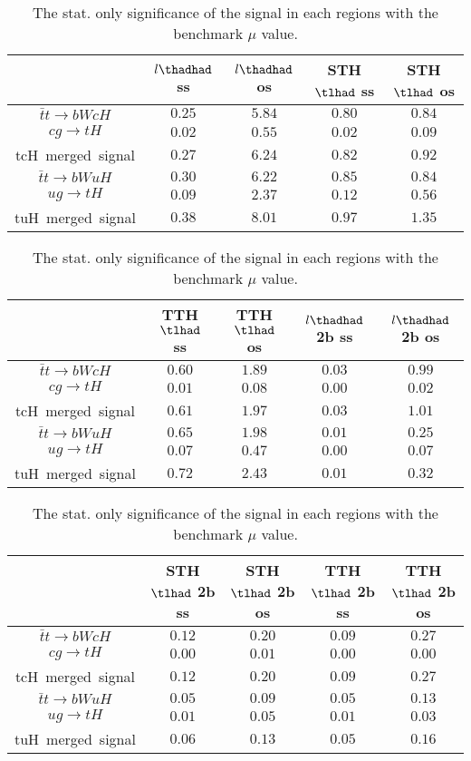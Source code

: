 \begin{table}
\footnotesize
\caption{The stat. only significance of the signal in each regions with the benchmark $\mu$ value.}
\centering
\begin{tabular}{|c|c|c|c|c|} \hline
 & $l\thadhad$ ss & $l\thadhad$ os & STH $\tlhad$ ss & STH $\tlhad$ os\\\hline
$\bar{t}t\to bWcH$ & $0.25$ & $5.84$ & $0.80$ & $0.84$\\\hline
$cg\to tH$ & $0.02$ & $0.55$ & $0.02$ & $0.09$\\\hline
tcH~merged~signal & $0.27$ & $6.24$ & $0.82$ & $0.92$\\\hline
$\bar{t}t\to bWuH$ & $0.30$ & $6.22$ & $0.85$ & $0.84$\\\hline
$ug\to tH$ & $0.09$ & $2.37$ & $0.12$ & $0.56$\\\hline
tuH~merged~signal & $0.38$ & $8.01$ & $0.97$ & $1.35$\\\hline
\end{tabular}
\begin{tabular}{|c|c|c|c|c|} \hline
 & TTH $\tlhad$ ss & TTH $\tlhad$ os & $l\thadhad$ 2b ss & $l\thadhad$ 2b os\\\hline
$\bar{t}t\to bWcH$ & $0.60$ & $1.89$ & $0.03$ & $0.99$\\\hline
$cg\to tH$ & $0.01$ & $0.08$ & $0.00$ & $0.02$\\\hline
tcH~merged~signal & $0.61$ & $1.97$ & $0.03$ & $1.01$\\\hline
$\bar{t}t\to bWuH$ & $0.65$ & $1.98$ & $0.01$ & $0.25$\\\hline
$ug\to tH$ & $0.07$ & $0.47$ & $0.00$ & $0.07$\\\hline
tuH~merged~signal & $0.72$ & $2.43$ & $0.01$ & $0.32$\\\hline
\end{tabular}
\begin{tabular}{|c|c|c|c|c|} \hline
 & STH $\tlhad$ 2b ss & STH $\tlhad$ 2b os & TTH $\tlhad$ 2b ss & TTH $\tlhad$ 2b os\\\hline
$\bar{t}t\to bWcH$ & $0.12$ & $0.20$ & $0.09$ & $0.27$\\\hline
$cg\to tH$ & $0.00$ & $0.01$ & $0.00$ & $0.00$\\\hline
tcH~merged~signal & $0.12$ & $0.20$ & $0.09$ & $0.27$\\\hline
$\bar{t}t\to bWuH$ & $0.05$ & $0.09$ & $0.05$ & $0.13$\\\hline
$ug\to tH$ & $0.01$ & $0.05$ & $0.01$ & $0.03$\\\hline
tuH~merged~signal & $0.06$ & $0.13$ & $0.05$ & $0.16$\\\hline
\end{tabular}
\label{tab:significance}
\end{table}
